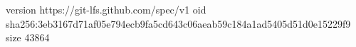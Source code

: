 version https://git-lfs.github.com/spec/v1
oid sha256:3eb3167d71af05e794ecb9fa5cd643c06aeab59c184a1ad5405d51d0e15229f9
size 43864
